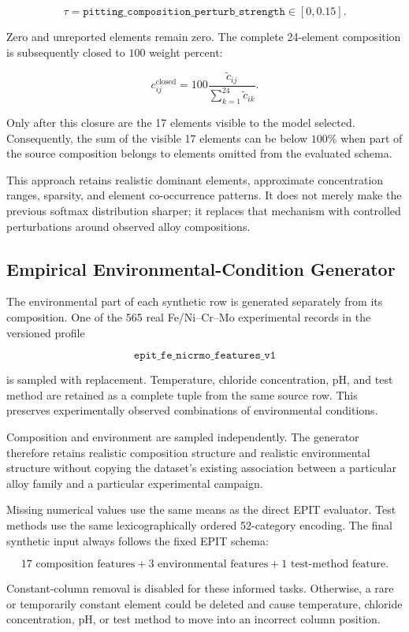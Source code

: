 \documentclass{article}
\begin{document}
\[
\tau
=
\texttt{pitting\_composition\_perturb\_strength}
\in[0,0.15].
\]

Zero and unreported elements remain zero. The complete 24-element composition
is subsequently closed to \(100\) weight percent:

\[
c_{ij}^{\mathrm{closed}}
=
100
\frac{\widetilde c_{ij}}
{\sum_{k=1}^{24}\widetilde c_{ik}}.
\]

Only after this closure are the 17 elements visible to the model selected.
Consequently, the sum of the visible 17 elements can be below \(100\%\) when
part of the source composition belongs to elements omitted from the evaluated
schema.

This approach retains realistic dominant elements, approximate concentration
ranges, sparsity, and element co-occurrence patterns. It does not merely make
the previous softmax distribution sharper; it replaces that mechanism with
controlled perturbations around observed alloy compositions.

\subsection{Empirical Environmental-Condition Generator}

The environmental part of each synthetic row is generated separately from its
composition. One of the 565 real Fe/Ni--Cr--Mo experimental records in the
versioned profile

\[
\texttt{epit\_fe\_nicrmo\_features\_v1}
\]

is sampled with replacement. Temperature, chloride concentration, pH, and test
method are retained as a complete tuple from the same source row. This
preserves experimentally observed combinations of environmental conditions.

Composition and environment are sampled independently. The generator therefore
retains realistic composition structure and realistic environmental structure
without copying the dataset's existing association between a particular alloy
family and a particular experimental campaign.

Missing numerical values use the same means as the direct EPIT evaluator. Test
methods use the same lexicographically ordered 52-category encoding. The final
synthetic input always follows the fixed EPIT schema:

\[
17\text{ composition features}
+
3\text{ environmental features}
+
1\text{ test-method feature}.
\]

Constant-column removal is disabled for these informed tasks. Otherwise, a
rare or temporarily constant element could be deleted and cause temperature,
chloride concentration, pH, or test method to move into an incorrect column
position.
\end{document}
